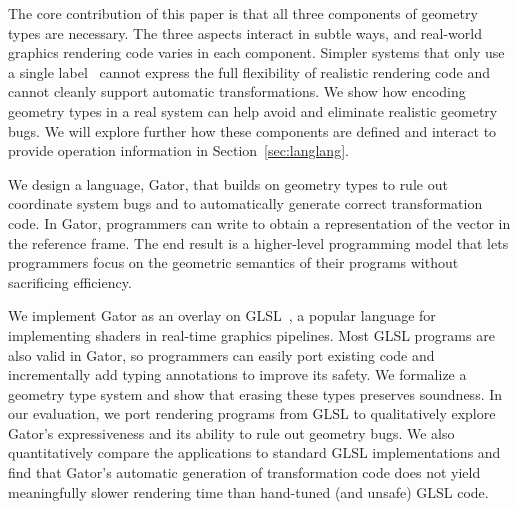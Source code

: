\documentclass[../main.tex]{subfiles}
\begin{document}
	The core contribution of this paper is that all three components of geometry types are necessary.  
	The three aspects interact in subtle ways, and real-world graphics rendering code varies in each component.
	Simpler systems that only use a single label~\cite{safegi} cannot express the full flexibility of realistic rendering code and cannot cleanly support automatic transformations.
	We show how encoding geometry types in a real system can help avoid and eliminate realistic geometry bugs.
	We will explore further how these components are defined and interact to provide operation information in Section~\ref{sec:langlang}.
	
	We design a language, Gator, that builds on geometry types to rule out coordinate system bugs and to automatically generate correct transformation code.
	In Gator, programmers can write  to obtain a representation of the  vector in the  reference frame.
	The end result is a higher-level programming model that lets programmers focus on the geometric semantics of their programs without sacrificing efficiency.
	
	We implement Gator as an overlay on GLSL~\cite{glsl}, a popular language for implementing shaders in real-time graphics pipelines.
	Most GLSL programs are also valid in Gator, so programmers can easily port existing code and incrementally add typing annotations to improve its safety.
	We formalize a geometry type system and show that erasing these types preserves soundness.
	In our evaluation, we port rendering programs from GLSL to qualitatively explore Gator's expressiveness and its ability to rule out geometry bugs.
	We also quantitatively compare the applications to standard GLSL implementations and find that Gator's automatic generation of transformation code does not yield meaningfully slower rendering time than hand-tuned (and unsafe) GLSL code.
	
\end{document}
